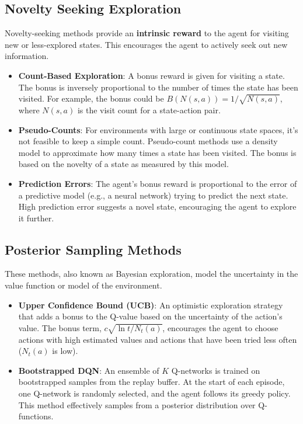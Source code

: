 \documentclass[12pt]{article}
\begin{document}
\subsection{Novelty Seeking Exploration}
Novelty-seeking methods provide an \textbf{intrinsic reward} to the agent for visiting new or less-explored states. This encourages the agent to actively seek out new information.
\begin{itemize}
    \item \textbf{Count-Based Exploration}: A bonus reward is given for visiting a state. The bonus is inversely proportional to the number of times the state has been visited. For example, the bonus could be $B(N(s, a)) = 1/\sqrt{N(s, a)}$, where $N(s, a)$ is the visit count for a state-action pair.
    \item \textbf{Pseudo-Counts}: For environments with large or continuous state spaces, it's not feasible to keep a simple count. Pseudo-count methods use a density model to approximate how many times a state has been visited. The bonus is based on the novelty of a state as measured by this model.
    \item \textbf{Prediction Errors}: The agent's bonus reward is proportional to the error of a predictive model (e.g., a neural network) trying to predict the next state. High prediction error suggests a novel state, encouraging the agent to explore it further.
\end{itemize}

\subsection{Posterior Sampling Methods}
These methods, also known as Bayesian exploration, model the uncertainty in the value function or model of the environment.
\begin{itemize}
    \item \textbf{Upper Confidence Bound (UCB)}: An optimistic exploration strategy that adds a bonus to the Q-value based on the uncertainty of the action's value. The bonus term, $c \sqrt{\ln t / N_t(a)}$, encourages the agent to choose actions with high estimated values and actions that have been tried less often ($N_t(a)$ is low).
    \item \textbf{Bootstrapped DQN}: An ensemble of $K$ Q-networks is trained on bootstrapped samples from the replay buffer. At the start of each episode, one Q-network is randomly selected, and the agent follows its greedy policy. This method effectively samples from a posterior distribution over Q-functions.
\end{itemize}
\end{document}
